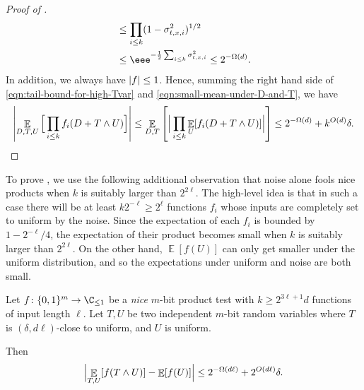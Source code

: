 \documentclass{toc}
\newcommand{\zo}{\{0,1\}}
\def\Blocklength{\ell}
\DeclarePairedDelimiter{\abs}{\lvert}{\rvert}
\DeclareMathOperator*{\E}{\mathbb{E}}                 %
\begin{document}
\begin{proof}[Proof of {}]
\begin{align}
      &\le \prod_{i \le k} (1 - \sigma_{t,x,i}^2)^{1/2} \nonumber \\
      &\le \eee^{-\frac{1}{2} \sum_{i \le k} \sigma_{t,x,i}^2} \le 2^{-\Omega(d)} .
    \end{align}
    In addition, we always have $\abs{f} \le 1$.
    Hence, summing the right hand side of \eqref{eqn:tail-bound-for-high-Tvar} and \eqref{eqn:small-mean-under-D-and-T}, we have
    \[
      \abs*{ \E_{D,T,U} \Big[ \prod_{i \le k} f_i(D + T \wedge U) \Big] }
      \le \E_{D,T} \left[ \Big| \prod_{i \le k} \E_U[f_i(D + T \wedge U)] \Big| \right]
      \le 2^{-\Omega(d)} + k^{O(d)} \delta . \qedhere
    \]
  \end{proof}

  To prove , we use the following
  additional observation that noise alone fools nice products when $k$ is suitably
	larger than $2^{2\Blocklength}$.
  The high-level idea is that in such a case there will be at least $k 2^{-\Blocklength} \ge 2^\Blocklength$ functions $f_i$ whose inputs are completely set to uniform by the noise. 
  Since the expectation of each $f_i$ is bounded by $1 - 2^{-\Blocklength}/4$, the expectation of their product becomes small when $k$ is suitably larger than $2^{2\Blocklength}$.
  On the other hand, $\E[f(U)]$ can only get smaller under the uniform distribution, and so the expectations under uniform and noise are both small.

  \begin{claim} \label{claim-truncation}
Let $f\colon \zo^m \to \C_{\le 1}$ be a \emph{nice} 
 $m$-bit %
product test with $k \ge 2^{3\Blocklength+1} d$ functions of input length $\Blocklength$.
    Let $T,U$ be two independent $m$-bit random variables where $T$ is $(\delta, d\Blocklength)$-close to uniform, and $U$ is uniform.  
%

    Then
    \[
      \Bigl| \E_{T,U}[f(T \wedge U)] - \E[f(U)] \Bigr| \le 2^{-\Omega(d\Blocklength)} + 2^{O(d\Blocklength)} \delta .
    \]
  \end{claim}
\end{document}
